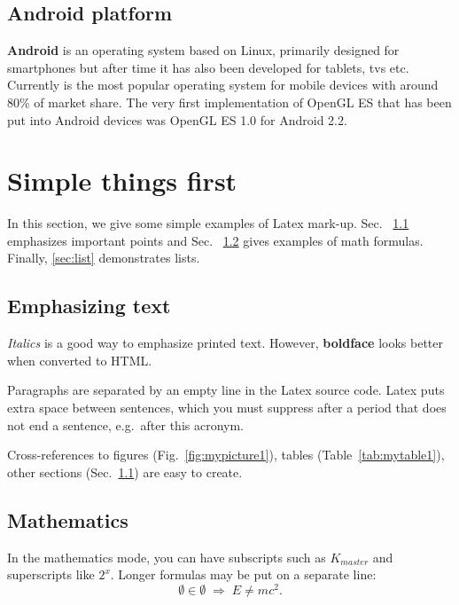 \documentclass[a4paper,12pt]{article}
\begin{document}
\subsection{Android platform} %
\textbf{Android} is an operating system based on Linux, primarily designed for smartphones but after time it has also been developed for tablets, tvs etc.
Currently is the most popular operating system for mobile devices with around 80\% of market share.
The very first implementation of OpenGL ES that has been put into Android devices was OpenGL ES 1.0 for Android 2.2.



\pagebreak[4]
\section{Simple things first}

In this section, we give some simple examples of Latex mark-up.
Sec. ~\ref{sec:emphasis} emphasizes important points and
Sec. ~\ref{sec:math} gives examples of math formulas.
Finally, \ref{sec:list} demonstrates lists.




\subsection{Emphasizing text}\label{sec:emphasis}

\textit{Italics} is a good way to emphasize printed text. However,
\textbf{boldface} looks better when converted to HTML.

Paragraphs are separated by an empty line in the Latex source code.
Latex puts extra space between sentences, which you must suppress
after a period that does not end a sentence, e.g.\ after this acronym.

Cross-references to figures (Fig.~\ref{fig:mypicture1}), tables
(Table~\ref{tab:mytable1}), other sections (Sec.~\ref{sec:emphasis})
are easy to create. 




\subsection{Mathematics}\label{sec:math}

In the mathematics mode, you can have subscripts such as $K_{master}$
and superscripts like $2^x$. Longer formulas may be put on a separate
line:
\[ \emptyset \in \emptyset \; \Rightarrow \; E \neq mc^2. \]
\end{document}
